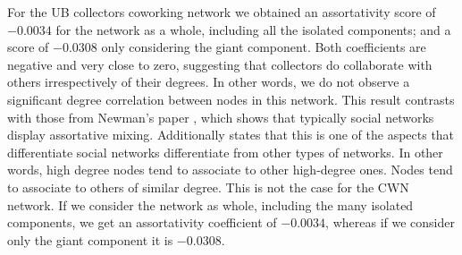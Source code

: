 For the UB collectors coworking network we obtained an assortativity score of $-0.0034$ for the network as a whole, including all the isolated components; and a score of $-0.0308$ only considering the giant component.
Both coefficients are negative and very close to zero, suggesting that collectors do collaborate with others irrespectively of their degrees. In other words, we do not observe a significant degree correlation between nodes in this network. 
This result contrasts with those from Newman's paper \cite{Newman2003b}, which shows that typically social networks display assortative mixing. Additionally states that this is one of the aspects that differentiate social networks differentiate from other types of networks. In other words, high degree nodes tend to associate to other high-degree ones. Nodes tend to associate to others of similar degree.
This is not the case for the CWN network. If we consider the network as whole, including the many isolated components, we get an assortativity coefficient of $-0.0034$, whereas if we consider only the giant component it is $-0.0308$. 


 
 










